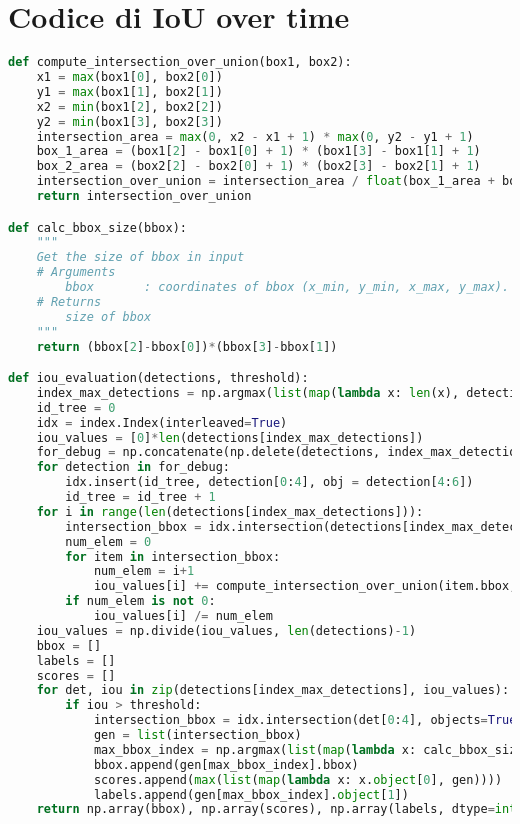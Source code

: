 
\chapter{Codice di IoU over time}
\label{appendix:a}
\begin{lstlisting}[caption={Algoritmo di IoU over time in Python}, language=Python, basicstyle=\tiny,label=code:ioutime]
def compute_intersection_over_union(box1, box2):
    x1 = max(box1[0], box2[0])
    y1 = max(box1[1], box2[1])
    x2 = min(box1[2], box2[2])
    y2 = min(box1[3], box2[3])
    intersection_area = max(0, x2 - x1 + 1) * max(0, y2 - y1 + 1)
    box_1_area = (box1[2] - box1[0] + 1) * (box1[3] - box1[1] + 1)
    box_2_area = (box2[2] - box2[0] + 1) * (box2[3] - box2[1] + 1)
    intersection_over_union = intersection_area / float(box_1_area + box_2_area - intersection_area)
    return intersection_over_union

def calc_bbox_size(bbox):
    """
    Get the size of bbox in input
    # Arguments
        bbox       : coordinates of bbox (x_min, y_min, x_max, y_max).
    # Returns
        size of bbox
    """
    return (bbox[2]-bbox[0])*(bbox[3]-bbox[1])

def iou_evaluation(detections, threshold):
    index_max_detections = np.argmax(list(map(lambda x: len(x), detections)))
    id_tree = 0
    idx = index.Index(interleaved=True)
    iou_values = [0]*len(detections[index_max_detections])
    for_debug = np.concatenate(np.delete(detections, index_max_detections, axis = 0))
    for detection in for_debug:
        idx.insert(id_tree, detection[0:4], obj = detection[4:6])
        id_tree = id_tree + 1
    for i in range(len(detections[index_max_detections])):
        intersection_bbox = idx.intersection(detections[index_max_detections][i][0:4], objects=True)
        num_elem = 0
        for item in intersection_bbox:
            num_elem = i+1
            iou_values[i] += compute_intersection_over_union(item.bbox, detections[index_max_detections][i][0:4])
        if num_elem is not 0:
            iou_values[i] /= num_elem
    iou_values = np.divide(iou_values, len(detections)-1)
    bbox = []
    labels = []
    scores = []
    for det, iou in zip(detections[index_max_detections], iou_values):
        if iou > threshold:
            intersection_bbox = idx.intersection(det[0:4], objects=True)
            gen = list(intersection_bbox)
            max_bbox_index = np.argmax(list(map(lambda x: calc_bbox_size(x), list(map(lambda x: x.bbox, gen)))))
            bbox.append(gen[max_bbox_index].bbox)
            scores.append(max(list(map(lambda x: x.object[0], gen))))
            labels.append(gen[max_bbox_index].object[1])
    return np.array(bbox), np.array(scores), np.array(labels, dtype=int)
\end{lstlisting}

